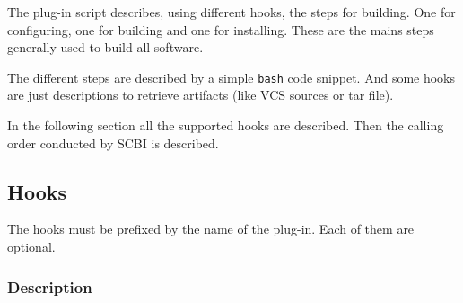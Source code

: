 \documentclass[a4paper,12pt,twoside]{article}
\newcommand{\code}[1]{\texttt{#1}}
\begin{document}
The plug-in script describes, using different hooks, the steps for building. One for configuring, one for building and one for installing. These are the mains steps generally used to build all software.

The different steps are described by a simple \code{bash} code snippet. And some hooks are just descriptions to retrieve artifacts (like VCS sources or tar file).

In the following section all the supported hooks are described. Then the calling order conducted by SCBI is described.

\subsection{Hooks}

The hooks must be prefixed by the name of the plug-in. Each of them are optional.

\subsubsection{Description}
\end{document}
